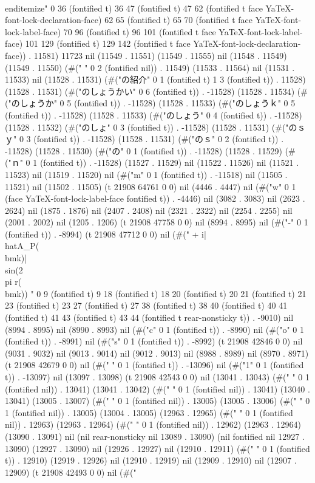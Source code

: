 	\\end{itemize}" 0 36 (fontified t) 36 47 (fontified t) 47 62 (fontified t face YaTeX-font-lock-declaration-face) 62 65 (fontified t) 65 70 (fontified t face YaTeX-font-lock-label-face) 70 96 (fontified t) 96 101 (fontified t face YaTeX-font-lock-label-face) 101 129 (fontified t) 129 142 (fontified t face YaTeX-font-lock-declaration-face)) . 11581) 11723 nil (11549 . 11551) (11549 . 11555) nil (11548 . 11549) (11549 . 11550) (#("	 " 0 2 (fontified nil)) . 11549) (11533 . 11564) nil (11531 . 11533) nil (11528 . 11531) (#("の紹介" 0 1 (fontified t) 1 3 (fontified t)) . 11528) (11528 . 11531) (#("のしょうかい" 0 6 (fontified t)) . -11528) (11528 . 11534) (#("のしょうか" 0 5 (fontified t)) . -11528) (11528 . 11533) (#("のしょうｋ" 0 5 (fontified t)) . -11528) (11528 . 11533) (#("のしょう" 0 4 (fontified t)) . -11528) (11528 . 11532) (#("のしょ" 0 3 (fontified t)) . -11528) (11528 . 11531) (#("のｓｙ" 0 3 (fontified t)) . -11528) (11528 . 11531) (#("のｓ" 0 2 (fontified t)) . -11528) (11528 . 11530) (#("の" 0 1 (fontified t)) . -11528) (11528 . 11529) (#("ｎ" 0 1 (fontified t)) . -11528) (11527 . 11529) nil (11522 . 11526) nil (11521 . 11523) nil (11519 . 11520) nil (#("m" 0 1 (fontified t)) . -11518) nil (11505 . 11521) nil (11502 . 11505) (t 21908 64761 0 0) nil (4446 . 4447) nil (#("w" 0 1 (face YaTeX-font-lock-label-face fontified t)) . -4446) nil (3082 . 3083) nil (2623 . 2624) nil (1875 . 1876) nil (2407 . 2408) nil (2321 . 2322) nil (2254 . 2255) nil (2001 . 2002) nil (1205 . 1206) (t 21908 47758 0 0) nil (8994 . 8995) nil (#("-" 0 1 (fontified t)) . -8994) (t 21908 47712 0 0) nil (#(" + i|\\hat{A}_P(\\bm{k})|\\sin(2\\pi r(\\bm{k})) " 0 9 (fontified t) 9 18 (fontified t) 18 20 (fontified t) 20 21 (fontified t) 21 23 (fontified t) 23 27 (fontified t) 27 38 (fontified t) 38 40 (fontified t) 40 41 (fontified t) 41 43 (fontified t) 43 44 (fontified t rear-nonsticky t)) . -9010) nil (8994 . 8995) nil (8990 . 8993) nil (#("c" 0 1 (fontified t)) . -8990) nil (#("o" 0 1 (fontified t)) . -8991) nil (#("s" 0 1 (fontified t)) . -8992) (t 21908 42846 0 0) nil (9031 . 9032) nil (9013 . 9014) nil (9012 . 9013) nil (8988 . 8989) nil (8970 . 8971) (t 21908 42679 0 0) nil (#(" " 0 1 (fontified t)) . -13096) nil (#("1" 0 1 (fontified t)) . -13097) nil (13097 . 13098) (t 21908 42543 0 0) nil (13041 . 13043) (#(" " 0 1 (fontified nil)) . 13041) (13041 . 13042) (#(" " 0 1 (fontified nil)) . 13041) (13040 . 13041) (13005 . 13007) (#(" " 0 1 (fontified nil)) . 13005) (13005 . 13006) (#(" " 0 1 (fontified nil)) . 13005) (13004 . 13005) (12963 . 12965) (#(" " 0 1 (fontified nil)) . 12963) (12963 . 12964) (#(" " 0 1 (fontified nil)) . 12962) (12963 . 12964) (13090 . 13091) nil (nil rear-nonsticky nil 13089 . 13090) (nil fontified nil 12927 . 13090) (12927 . 13090) nil (12926 . 12927) nil (12910 . 12911) (#("	" 0 1 (fontified t)) . 12910) (12919 . 12926) nil (12910 . 12919) nil (12909 . 12910) nil (12907 . 12909) (t 21908 42493 0 0) nil (#("
